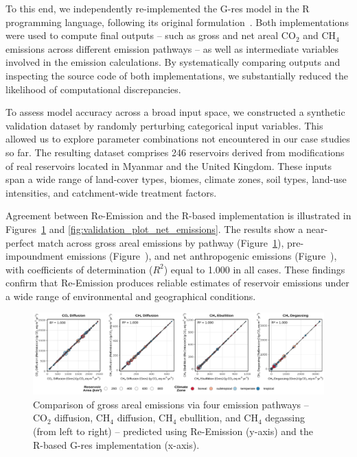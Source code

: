 \documentclass[final,1p,times]{elsarticle}
\begin{document}
To this end, we independently re-implemented the G-res model in the R programming language, following its original formulation~\cite{Prairie2021}.
Both implementations were used to compute final outputs -- such as gross and net areal CO$_2$ and CH$_4$ emissions across different emission pathways -- as well as intermediate variables involved in the emission calculations.
By systematically comparing outputs and inspecting the source code of both implementations, we substantially reduced the likelihood of computational discrepancies.

To assess model accuracy across a broad input space, we constructed a synthetic validation dataset by randomly perturbing categorical input variables.
This allowed us to explore parameter combinations not encountered in our case studies so far.
The resulting dataset comprises 246 reservoirs derived from modifications of real reservoirs located in Myanmar and the United Kingdom.
These inputs span a wide range of land-cover types, biomes, climate zones, soil types, land-use intensities, and catchment-wide treatment factors.

Agreement between Re-Emission and the R-based implementation is illustrated in Figures~\ref{fig:validation_plot_gross_emissions} and \ref{fig:validation_plot_net_emissions}.
The results show a near-perfect match across gross areal emissions by pathway (Figure~\ref{fig:validation_plot_gross_emissions}), pre-impoundment emissions (Figure~), and net anthropogenic emissions (Figure~), with coefficients of determination ($R^2$) equal to 1.000 in all cases.
These findings confirm that Re-Emission produces reliable estimates of reservoir emissions under a wide range of environmental and geographical conditions.

\begin{figure}[ht]
    \centering
    \includegraphics[width=1.0\textwidth]{figures/comparison_plot.pdf}
    \caption{{Comparison of gross areal emissions via four emission pathways -- CO$_2$ diffusion, CH$_4$ diffusion, CH$_4$ ebullition, and CH$_4$ degassing (from left to right) -- predicted using Re-Emission (y-axis) and the R-based G-res implementation (x-axis).}}
    \label{fig:validation_plot_gross_emissions}
\end{figure}
\end{document}
